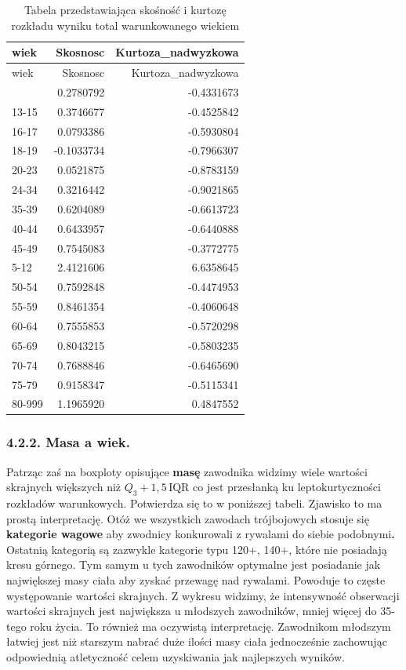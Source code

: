 \documentclass[
  letterpaper,
  DIV=11,
  numbers=noendperiod]{scrartcl}
\begin{document}
\begin{longtable}[]{@{}lrr@{}}
\caption{Tabela przedstawiająca skośność i kurtozę rozkładu wyniku total
warunkowanego wiekiem }\tabularnewline
\toprule\noalign{}
wiek & Skosnosc & Kurtoza\_nadwyzkowa \\
\midrule\noalign{}
\endfirsthead
\toprule\noalign{}
wiek & Skosnosc & Kurtoza\_nadwyzkowa \\
\midrule\noalign{}
\endhead
\bottomrule\noalign{}
\endlastfoot
& 0.2780792 & -0.4331673 \\
13-15 & 0.3746677 & -0.4525842 \\
16-17 & 0.0793386 & -0.5930804 \\
18-19 & -0.1033734 & -0.7966307 \\
20-23 & 0.0521875 & -0.8783159 \\
24-34 & 0.3216442 & -0.9021865 \\
35-39 & 0.6204089 & -0.6613723 \\
40-44 & 0.6433957 & -0.6440888 \\
45-49 & 0.7545083 & -0.3772775 \\
5-12 & 2.4121606 & 6.6358645 \\
50-54 & 0.7592848 & -0.4474953 \\
55-59 & 0.8461354 & -0.4060648 \\
60-64 & 0.7555853 & -0.5720298 \\
65-69 & 0.8043215 & -0.5803235 \\
70-74 & 0.7688846 & -0.6465690 \\
75-79 & 0.9158347 & -0.5115341 \\
80-999 & 1.1965920 & 0.4847552 \\
\end{longtable}

\hypertarget{masa-a-wiek.}{%
\subsubsection{4.2.2. Masa a wiek.}\label{masa-a-wiek.}}

Patrząc zaś na boxploty opisujące \textbf{masę} zawodnika widzimy wiele
wartości skrajnych większych niż \(Q_3 + 1,5\,\text{IQR}\) co jest
przesłanką ku leptokurtyczności rozkładów warunkowych. Potwierdza się to
w poniższej tabeli. Zjawisko to ma prostą interpretację. Otóż we
wszystkich zawodach trójbojowych stosuje się \textbf{kategorie wagowe}
aby zwodnicy konkurowali z rywalami do siebie podobnymi\textbf{.}
Ostatnią kategorią są zazwykle kategorie typu 120+, 140+, które nie
posiadają kresu górnego. Tym samym u tych zawodników optymalne jest
posiadanie jak największej masy ciała aby zyskać przewagę nad rywalami.
Powoduje to częste występowanie wartości skrajnych. Z wykresu widzimy,
że intensywność obserwacji wartości skrajnych jest największa u
młodszych zawodników, mniej więcej do 35-tego roku życia. To również ma
oczywistą interpretację. Zawodnikom młodszym łatwiej jest niż starszym
nabrać duże ilości masy ciała jednocześnie zachowując odpowiednią
atletyczność celem uzyskiwania jak najlepszych wyników.
\end{document}
